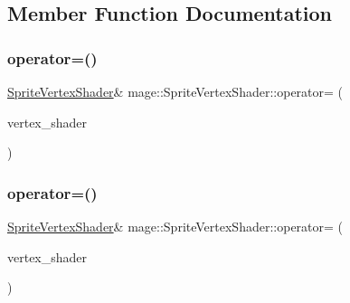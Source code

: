 \subsection{Member Function Documentation}
\hypertarget{classmage_1_1_sprite_vertex_shader_a4400ddda9637b280b7c8aedeeec6e4e7}{}\label{classmage_1_1_sprite_vertex_shader_a4400ddda9637b280b7c8aedeeec6e4e7} 
\subsubsection{\texorpdfstring{operator=()}{operator=()}\hspace{0.1cm}{\footnotesize\ttfamily [1/2]}}
{\footnotesize\ttfamily \hyperlink{classmage_1_1_sprite_vertex_shader}{Sprite\+Vertex\+Shader}\& mage\+::\+Sprite\+Vertex\+Shader\+::operator= (\begin{DoxyParamCaption}\item[{const \hyperlink{classmage_1_1_sprite_vertex_shader}{Sprite\+Vertex\+Shader} \&}]{vertex\+\_\+shader }\end{DoxyParamCaption})\hspace{0.3cm}{\ttfamily [delete]}}

\hypertarget{classmage_1_1_sprite_vertex_shader_aac64cf5df2b118ba95be72aef2bd3dca}{}\label{classmage_1_1_sprite_vertex_shader_aac64cf5df2b118ba95be72aef2bd3dca} 
\subsubsection{\texorpdfstring{operator=()}{operator=()}\hspace{0.1cm}{\footnotesize\ttfamily [2/2]}}
{\footnotesize\ttfamily \hyperlink{classmage_1_1_sprite_vertex_shader}{Sprite\+Vertex\+Shader}\& mage\+::\+Sprite\+Vertex\+Shader\+::operator= (\begin{DoxyParamCaption}\item[{\hyperlink{classmage_1_1_sprite_vertex_shader}{Sprite\+Vertex\+Shader} \&\&}]{vertex\+\_\+shader }\end{DoxyParamCaption})\hspace{0.3cm}{\ttfamily [delete]}}

\hypertarget{classmage_1_1_sprite_vertex_shader_a6daf06fe73ed40cc7b71e474070144fc}{}\label{classmage_1_1_sprite_vertex_shader_a6daf06fe73ed40cc7b71e474070144fc} 
